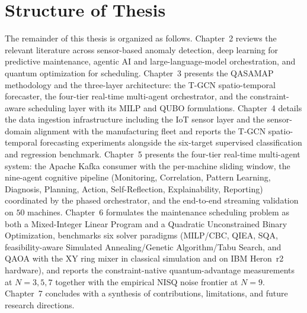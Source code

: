 \section{Structure of Thesis}

The remainder of this thesis is organized as follows. Chapter~2 reviews the relevant literature across sensor-based anomaly detection, deep learning for predictive maintenance, agentic AI and large-language-model orchestration, and quantum optimization for scheduling. Chapter~3 presents the QASAMAP methodology and the three-layer architecture: the T-GCN spatio-temporal forecaster, the four-tier real-time multi-agent orchestrator, and the constraint-aware scheduling layer with its MILP and QUBO formulations. Chapter~4 details the data ingestion infrastructure including the IoT sensor layer and the sensor-domain alignment with the manufacturing fleet and reports the T-GCN spatio-temporal forecasting experiments alongside the six-target supervised classification and regression benchmark. Chapter~5 presents the four-tier real-time multi-agent system: the Apache Kafka consumer with the per-machine sliding window, the nine-agent cognitive pipeline (Monitoring, Correlation, Pattern Learning, Diagnosis, Planning, Action, Self-Reflection, Explainability, Reporting) coordinated by the phased orchestrator, and the end-to-end streaming validation on $50$ machines. Chapter~6 formulates the maintenance scheduling problem as both a Mixed-Integer Linear Program and a Quadratic Unconstrained Binary Optimization, benchmarks six solver paradigms (MILP/CBC, QIEA, SQA, feasibility-aware Simulated Annealing/Genetic Algorithm/Tabu Search, and QAOA with the XY ring mixer in classical simulation and on IBM Heron~r2 hardware), and reports the constraint-native quantum-advantage measurements at $N=3,5,7$ together with the empirical NISQ noise frontier at $N=9$. Chapter~7 concludes with a synthesis of contributions, limitations, and future research directions.
